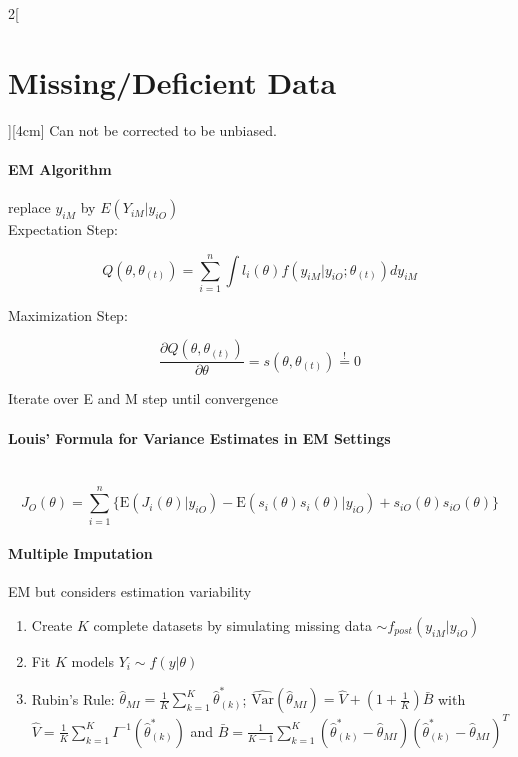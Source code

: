 \documentclass[8pt]{extarticle}
\begin{document}
\begin{multicols}{2}[\section{Missing/Deficient Data}][4cm]
\noindent Can not be corrected to be unbiased.

\paragraph{EM Algorithm} replace $y_{iM}$ by $E(Y_{iM}|y_{iO})$ \\

\noindent Expectation Step:

$$Q(\theta,\theta_{(t)}) = \sum_{i=1}^n\int l_i(\theta)f(y_{iM}|y_{iO};\theta_{(t)})dy_{iM}$$

\noindent Maximization Step:

$$\frac{\partial Q(\theta,\theta_{(t)})}{\partial \theta} = s(\theta,\theta_{(t)}) \overset{!}{=} 0 $$



\noindent Iterate over E and M step until convergence

\paragraph{Louis' Formula for Variance Estimates in EM Settings} \ \\

$$J_O(\theta) = \sum_{i=1}^n \{\mathrm{E}(J_i(\theta)|y_{iO}) - \mathrm{E}(s_i(\theta)s_i(\theta)|y_{iO}) + s_{iO}(\theta)s_{iO}(\theta)\}$$


 \paragraph{Multiple Imputation} EM but considers estimation variability
 
 \begin{enumerate}
 \item Create $K$ complete datasets by simulating missing data $\sim f_{post}(y_{iM}|y_{iO})$
 \item Fit $K$ models $Y_i \sim f(y|\theta)$
 \item Rubin's Rule: $\hat{\theta}_{MI} = \frac{1}{K}\sum_{k=1}^K \hat{\theta}^*_{(k)}$;
  $\widehat{\text{Var}}(\hat{\theta}_{MI}) = \hat{V} {+} (1{+}\frac{1}{K})\bar{B}$ 
 with $\hat{V} = \frac{1}{K} \sum_{k=1}^K I^{-1}(\hat{\theta}_{(k)}^*)$ 
 and $\bar{B} = \frac{1}{K-1} \sum_{k=1}^K (\hat{\theta}_{(k)}^* - \hat{\theta}_{MI}) (\hat{\theta}_{(k)}^* - \hat{\theta}_{MI})^T$
 \end{enumerate}
 

\end{multicols}
\end{document}
